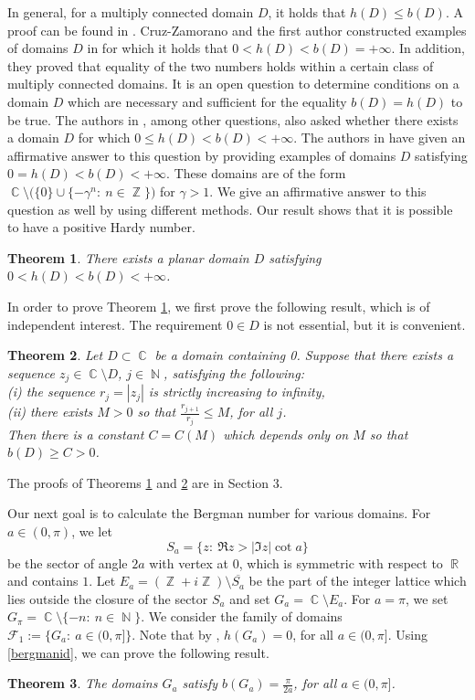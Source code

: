\documentclass[11pt, letterpaper,leqno]{amsart}
\numberwithin{equation}{section}
\newtheorem{theorem}{Theorem}[section]
\theoremstyle{definition}
\DeclareMathOperator{\N}{\mathbb{N}}
\DeclareMathOperator{\C}{\mathbb{C}}
\DeclareMathOperator{\R}{\mathbb{R}}
\DeclareMathOperator{\Z}{\mathbb{Z}}
\begin{document}
In general, for a multiply connected domain $D$, it holds that $h(D)\leq b(D)$. A proof can be found in \cite[Lemma 2.2]{Krf3}. Cruz-Zamorano  and the first author constructed examples of domains $D$ in \cite{BZ} for which it holds that $0<h(D)<b(D)=+\infty$. In addition, they proved that equality of the two numbers holds within a certain class of multiply connected domains. It is an open question to determine conditions on a domain $D$ which are necessary and sufficient for the equality $b(D)=h(D)$ to be true. The authors in \cite{BZ}, among other questions, also asked whether there exists a domain $D$ for which $0\leq h(D)<b(D)<+\infty$. The authors in \cite[Corollary 7.1]{CZRP} have given an affirmative answer to this question by providing examples of domains $D$ satisfying $0=h(D)<b(D)<+\infty$. These domains are of the form $\C\setminus\big(\{0\}\cup\{-\gamma^n:\ n\in\Z\}\big)$ for $\gamma>1$. We give an affirmative answer to this question as well by using different methods. Our result shows that it is possible to have a positive Hardy number.
\begin{theorem}\label{Theorem1}
There exists a planar domain $D$ satisfying $0<h(D)<b(D)<+\infty$.
\end{theorem}

In order to prove Theorem \ref{Theorem1}, we first prove the following result, which is of independent interest. The requirement $0\in D$ is not essential, but it is convenient. 
\begin{theorem}\label{Theorem2}
Let $D\subset\C$ be a domain containing 0. Suppose that there exists a sequence $z_j\in \C\setminus D$, $j\in\N$, satisfying the following:\\
(i) the sequence $r_j=|z_j|$ is strictly increasing to infinity,\\
(ii) there exists $M>0$ so that $\frac{r_{j+1}}{r_j}\leq M$, for all $j$.\\
Then there is a constant $C=C(M)$ which depends only on $M$ so that $b(D)\geq C>0$.
\end{theorem}
The proofs of Theorems \ref{Theorem1} and \ref{Theorem2} are in Section 3.

\medskip

Our next goal is to calculate the Bergman number for various domains. For $a\in (0,\pi)$, we let
\begin{equation}\label{sector}
	S_a=\{z:\ \Re z> |\Im z|\cot a\}
\end{equation}
be the sector of angle $2a$ with vertex at $0$, which is symmetric with respect to $\R$ and contains $1$. Let $E_a=(\Z+i\Z)\setminus\overline{S_a}$ be the part of the integer lattice which lies outside the closure of the sector $S_a$ and set $G_a=\C\setminus E_a$. For $a=\pi$, we set $G_\pi= \C\setminus\{-n:\ n\in\N\}$. We consider the family of domains $\mathcal{F}_1:=\{G_a:\ a\in (0,\pi]\}$. Note that by \cite[Theorem 2.4 (i)]{KimSug}, $h(G_a)=0$, for all $a\in (0,\pi]$. Using \eqref{bergmanid}, we can prove the following result.
\begin{theorem}\label{Theorem3}
The domains $G_a$ satisfy $b(G_a)=\frac{\pi}{2a}$, for all $a\in (0,\pi]$.
\end{theorem}
\end{document}
